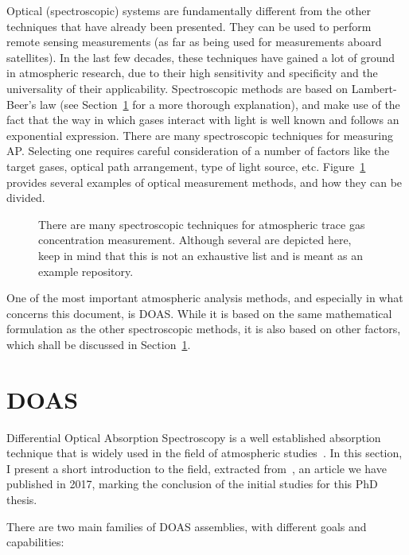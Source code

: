 Optical (spectroscopic) systems are fundamentally different from the
other techniques that have already been presented. They can be used to
perform remote sensing measurements (as far as being used for
measurements aboard satellites). In the last few decades, these
techniques have gained a lot of ground in atmospheric research, due to
their high sensitivity and specificity and the universality of their
applicability. Spectroscopic methods are based on Lambert-Beer's law
(see Section~\ref{sec:doas} for a more thorough explanation), and make
use of the fact that the way in which gases interact with light is well
known and follows an exponential expression. There are many
spectroscopic techniques for measuring \gls{AP}. Selecting one requires
careful consideration of a number of factors like the target gases,
optical path arrangement, type of light source, etc.
Figure~\ref{fig:selecting_spectroscopic_method} provides several
examples of optical measurement methods, and how they can be divided.

\begin{figure}[htpb]
    \centering
    \missingfigure{}
    \caption{There are many spectroscopic techniques for atmospheric
    trace gas concentration measurement. Although several are depicted
    here, keep in mind that this is not an exhaustive list and is meant as
    an example repository.}
    \label{fig:selecting_spectroscopic_method}
\end{figure}

One of the most important atmospheric analysis methods, and especially
in what concerns this document, is \gls{DOAS}. While it is based on the
same mathematical formulation as the other spectroscopic methods, it is
also based on other factors, which shall be discussed in
Section~\ref{sec:doas}.

\section{DOAS}%
\label{sec:doas}

Differential Optical Absorption Spectroscopy is a well established
absorption technique that is widely used in the field of atmospheric
studies~\cite{Platt2007}. In this section, I present a short
introduction to the field, extracted from~\cite{ValentedeAlmeida2017},
an article we have published in 2017, marking the conclusion of the
initial studies for this PhD thesis.

There are two main families of \gls{DOAS} assemblies, with different
goals and capabilities:

